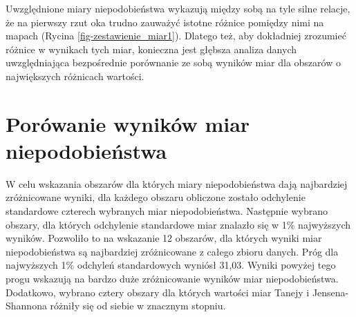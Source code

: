 \documentclass{amuthesis}
\begin{document}
Uwzględnione miary niepodobieństwa wykazują między sobą na tyle silne
relacje, że na pierwszy rzut oka trudno zauważyć istotne różnice
pomiędzy nimi na mapach (Rycina \ref{fig-zestawienie_miar1}). Dlatego
też, aby dokładniej zrozumieć różnice w wynikach tych miar, konieczna
jest głębsza analiza danych uwzględniająca bezpośrednie porównanie ze
sobą wyników miar dla obszarów o największych różnicach wartości.

\hypertarget{poruxf3wanie-wynikuxf3w-miar-niepodobieux144stwa}{%
\section{Porówanie wyników miar
niepodobieństwa}\label{poruxf3wanie-wynikuxf3w-miar-niepodobieux144stwa}}

W celu wskazania obszarów dla których miary niepodobieństwa dają
najbardziej zróżnicowane wyniki, dla każdego obszaru obliczone zostało
odchylenie standardowe czterech wybranych miar niepodobieństwa.
Następnie wybrano obszary, dla których odchylenie standardowe miar
znalazło się w 1\% najwyższych wyników. Pozwoliło to na wskazanie 12
obszarów, dla których wyniki miar niepodobieństwa są najbardziej
zróżnicowane z całego zbioru danych. Próg dla najwyższych 1\% odchyleń
standardowych wyniósł 31,03. Wyniki powyżej tego progu wskazują na
bardzo duże zróżnicowanie wyników miar niepodobieństwa. Dodatkowo,
wybrano cztery obszary dla których wartości miar Tanejy i
Jensena-Shannona różniły się od siebie w znacznym stopniu.
\end{document}
